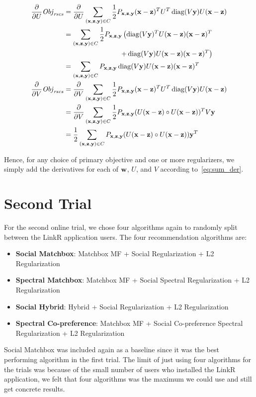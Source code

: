 \begin{itemize}
\begin{align*}
\frac{\partial}{\partial U} \mathit{Obj}_{\mathit{rscs}} & = \frac{\partial}{\partial U} \sum_{(\mathbf{x},\mathbf{z},\mathbf{y}) \in C} \frac{1}{2} P_{\mathbf{x},\mathbf{z},\mathbf{y}} (\mathbf{x} - \mathbf{z})^T U^T \operatorname{diag}(V\mathbf{y}) U (\mathbf{x} - \mathbf{z})\\
& = \sum_{(\mathbf{x},\mathbf{z},\mathbf{y}) \in C} \frac{1}{2} P_{\mathbf{x},\mathbf{z},\mathbf{y}} \left( \operatorname{diag}(V\mathbf{y})^T U (\mathbf{x} - \mathbf{z}) (\mathbf{x} - \mathbf{z})^T \right.\\
& \left. \qquad \qquad \qquad \qquad + \operatorname{diag}(V\mathbf{y}) U (\mathbf{x} - \mathbf{z}) (\mathbf{x} - \mathbf{z})^T \right)\\
& = \sum_{(\mathbf{x},\mathbf{z},\mathbf{y}) \in C} P_{\mathbf{x},\mathbf{z},\mathbf{y}} \operatorname{diag}(V\mathbf{y}) U (\mathbf{x} - \mathbf{z}) (\mathbf{x} - \mathbf{z})^T\\
\frac{\partial}{\partial V} \mathit{Obj}_{\mathit{rscs}} & = \frac{\partial}{\partial V} \sum_{(\mathbf{x},\mathbf{z},\mathbf{y}) \in C} \frac{1}{2} P_{\mathbf{x},\mathbf{z},\mathbf{y}} (\mathbf{x} - \mathbf{z})^T U^T \operatorname{diag}(V\mathbf{y}) U (\mathbf{x} - \mathbf{z})\\
& = \frac{\partial}{\partial V} \sum_{(\mathbf{x},\mathbf{z},\mathbf{y}) \in C} \frac{1}{2} P_{\mathbf{x},\mathbf{z},\mathbf{y}} (U(\mathbf{x}-\mathbf{z}) \circ U(\mathbf{x}-\mathbf{z}))^T V\mathbf{y}\\
& = \frac{1}{2} \sum_{(\mathbf{x},\mathbf{z},\mathbf{y}) \in C} P_{\mathbf{x},\mathbf{z},\mathbf{y}} (U(\mathbf{x}-\mathbf{z}) \circ U(\mathbf{x}-\mathbf{z})) \mathbf{y}^T
\end{align*}
\end{itemize}

Hence, for any choice of primary objective and one or more regularizers,
we simply add the derivatives for each of $\mathbf{w}$, $U$, and $V$
according to~\eqref{eq:sum_der}.

\section{Second Trial}

For the second online trial, we chose four algorithms again to randomly split between the LinkR application users. The four recommendation algorithms are:

\begin{itemize}
\item{{\bf Social Matchbox}: Matchbox MF + Social Regularization +  L2 Regularization}
\item{{\bf Spectral Matchbox}: Matchbox MF + Social Spectral Regularization + L2 Regularization}
\item{{\bf Social Hybrid}: Hybrid + Social Regularization + L2 Regularization}
\item{{\bf Spectral Co-preference}: Matchbox MF + Social Co-preference Spectral Regularization + L2 Regularization}
\end{itemize}

Social Matchbox was included again as a baseline since it was the best performing algorithm in the first trial. The limit of just using four algorithms for the trials was because of the small number of users who installed the LinkR application, we felt that four algorithms was the maximum we could use and still get concrete results.


